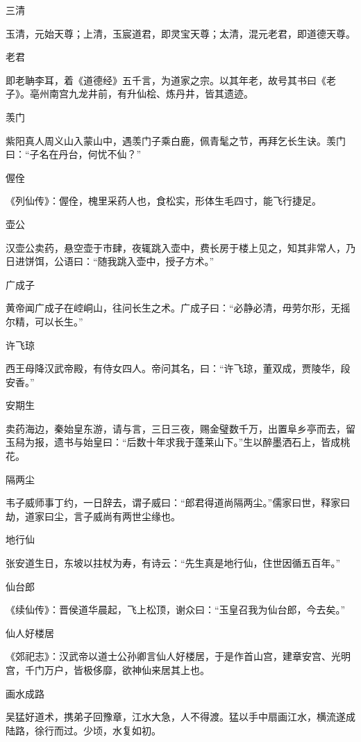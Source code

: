 \documentclass[a4paper,12pt,UTF8,twoside]{ctexbook}
\begin{document}
    三清
    
    玉清，元始天尊；上清，玉宸道君，即灵宝天尊；太清，混元老君，即道德天尊。
    
    老君
    
    即老聃李耳，着《道德经》五千言，为道家之宗。以其年老，故号其书曰《老子》。亳州南宫九龙井前，有升仙桧、炼丹井，皆其遗迹。
    
    羡门
    
    紫阳真人周义山入蒙山中，遇羡门子乘白鹿，佩青髦之节，再拜乞长生诀。羡门曰：“子名在丹台，何忧不仙？”
    
    偓佺
    
    《列仙传》：偓佺，槐里采药人也，食松实，形体生毛四寸，能飞行捷足。
    
    壶公
    
    汉壶公卖药，悬空壶于市肆，夜辄跳入壶中，费长房于楼上见之，知其非常人，乃日进饼饵，公语曰：“随我跳入壶中，授子方术。”
    
    广成子
    
    黄帝闻广成子在崆峒山，往问长生之术。广成子曰：“必静必清，毋劳尔形，无摇尔精，可以长生。”
    
    许飞琼
    
    西王母降汉武帝殿，有侍女四人。帝问其名，曰：“许飞琼，董双成，贾陵华，段安香。”
    
    安期生
    
    卖药海边，秦始皇东游，请与言，三日三夜，赐金璧数千万，出置阜乡亭而去，留玉舄为报，遗书与始皇曰：“后数十年求我于蓬莱山下。”生以醉墨洒石上，皆成桃花。
    
    隔两尘
    
    韦子威师事丁约，一日辞去，谓子威曰：“郎君得道尚隔两尘。”儒家曰世，释家曰劫，道家曰尘，言子威尚有两世尘缘也。
    
    地行仙
    
    张安道生日，东坡以拄杖为寿，有诗云：“先生真是地行仙，住世因循五百年。”
    
    仙台郎
    
    《续仙传》：晋侯道华晨起，飞上松顶，谢众曰：“玉皇召我为仙台郎，今去矣。”
    
    仙人好楼居
    
    《郊祀志》：汉武帝以道士公孙卿言仙人好楼居，于是作首山宫，建章安宫、光明宫，千门万户，皆极侈靡，欲神仙来居其上也。
    
    画水成路
    
    吴猛好道术，携弟子回豫章，江水大急，人不得渡。猛以手中扇画江水，横流遂成陆路，徐行而过。少顷，水复如初。
    
\end{document}
